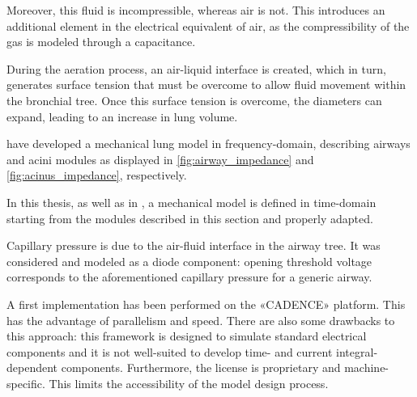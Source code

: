 Moreover, this fluid is incompressible, whereas air is not. This
introduces an additional element in the electrical equivalent of air,
as the compressibility of the gas is modeled through a
capacitance.


During the aeration process, an air-liquid interface is created, which
in turn, generates surface tension that must be overcome to allow fluid
movement within the bronchial tree. Once this surface tension is
overcome, the diameters can expand, leading to an increase in lung
volume.

\textcite{lutchen1997} have developed a mechanical lung model in
frequency-domain, describing airways and acini modules as displayed
in \cref{fig:airway_impedance} and \cref{fig:acinus_impedance},
respectively.

\vspace{2.25em}



\vspace{2.25em}



In this thesis, as well as in \textcite{mani2020}, a mechanical model
is defined in time-domain starting from the modules described in this
section and properly adapted.




Capillary pressure is due to the air-fluid interface in the airway tree.
It was considered and modeled as a diode component: opening
threshold voltage corresponds to the aforementioned capillary
pressure for a generic airway.

A first implementation has been performed on the «CADENCE» platform.  This
has the advantage of parallelism and speed.  There are also some
drawbacks to this approach: this framework is designed to simulate
standard electrical components and it is not well-suited to develop
time- and current integral-dependent components.  Furthermore, the license
is proprietary and machine-specific.  This limits the accessibility
of the model design process.


